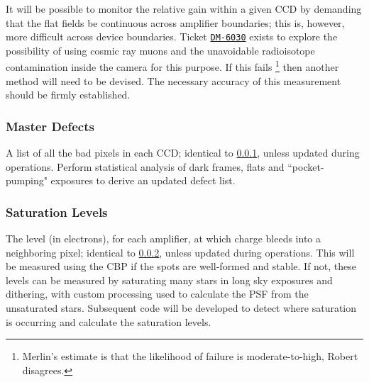 It will be possible to monitor the relative gain within a given CCD by demanding that the flat fields be continuous across amplifier boundaries; this is, however, more difficult across device boundaries. Ticket \hyperref{https://jira.lsstcorp.org/browse/DM-6030}{}{}{\texttt{DM-6030}} exists to explore the possibility of using cosmic ray muons and the unavoidable radioisotope contamination inside the camera for this purpose. If this fails \footnote{Merlin's estimate is that the likelihood of failure is moderate-to-high, Robert disagrees.} then another method will need to be devised. The necessary accuracy of this measurement should be firmly established.


\subsubsection{Master Defects}\label{sec:CPP:output:defectList}
A list of all the bad pixels in each CCD; identical to \secsymbol\ref{sec:CPP:output:defectList}, unless updated during operations.
\alg Perform statistical analysis of dark frames, flats and ``pocket-pumping" exposures to derive an updated defect list.


\subsubsection{Saturation Levels}\label{sec:CPP:output:saturationLevel}
The level (in electrons), for each amplifier, at which charge bleeds into a neighboring pixel; identical to \secsymbol\ref{sec:CPP:output:saturationLevel}, unless updated during operations.
\alg This will be measured using the CBP if the spots are well-formed and stable. If not, these levels can be measured by saturating many stars in long sky exposures and dithering, with custom processing used to calculate the PSF from the unsaturated stars. Subsequent code will be developed to detect where saturation is occurring and calculate the saturation levels.


